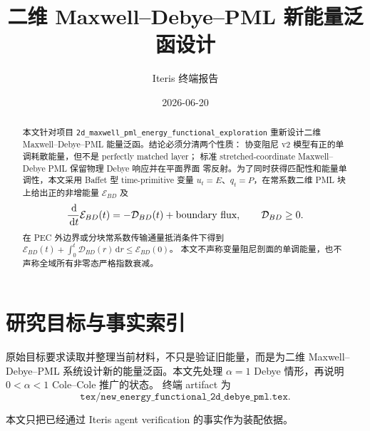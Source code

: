 \documentclass[UTF8,a4paper,11pt]{ctexart}
\title{二维 Maxwell--Debye--PML 新能量泛函设计}
\author{Iteris 终端报告}
\date{2026-06-20}
\newcommand{\dd}{\,\mathrm d}
\newcommand{\Ecal}{\mathcal E}
\newcommand{\Dcal}{\mathcal D}
\begin{document}
\maketitle

\begin{abstract}
本文针对项目
\texttt{2d\_maxwell\_pml\_energy\_functional\_exploration}
重新设计二维 Maxwell--Debye--PML 能量泛函。结论必须分清两个性质：
协变阻尼 v2 模型有正的单调耗散能量，但不是 perfectly matched layer；
标准 stretched-coordinate Maxwell--Debye PML 保留物理 Debye 响应并在平面界面
零反射。为了同时获得匹配性和能量单调性，本文采用 Baffet 型 time-primitive
变量 \(u_t=E\)、\(q_t=P\)，在常系数二维 PML 块上给出正的非增能量
\(\Ecal_{BD}\) 及
\[
\frac{\dd}{\dd t}\Ecal_{BD}(t)
=-\Dcal_{BD}(t)+\hbox{boundary flux},\qquad \Dcal_{BD}\ge0.
\]
在 PEC 外边界或分块常系数传输通量抵消条件下得到
\(\Ecal_{BD}(t)+\int_0^t\Dcal_{BD}(r)\dd r\le \Ecal_{BD}(0)\)。
本文不声称变量阻尼剖面的单调能量，也不声称全域所有非零态严格指数衰减。
\end{abstract}

\tableofcontents

\section{研究目标与事实索引}

原始目标要求读取并整理当前材料，不只是验证旧能量，而是为二维
Maxwell--Debye--PML 系统设计新的能量泛函。本文先处理
\(\alpha=1\) Debye 情形，再说明 \(0<\alpha<1\) Cole--Cole 推广的状态。
终端 artifact 为
\[
\texttt{tex/new\_energy\_functional\_2d\_debye\_pml.tex}.
\]

本文只把已经通过 Iteris agent verification 的事实作为装配依据。
\end{document}
